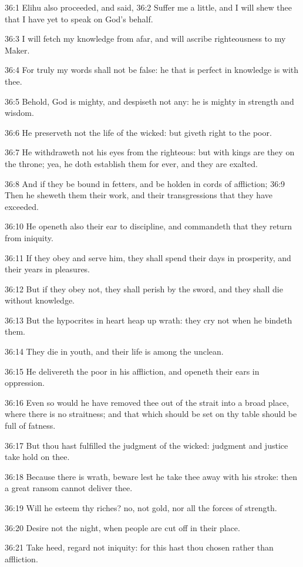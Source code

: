 36:1 Elihu also proceeded, and said, 36:2 Suffer me a little, and I
will shew thee that I have yet to speak on God's behalf.

36:3 I will fetch my knowledge from afar, and will ascribe
righteousness to my Maker.

36:4 For truly my words shall not be false: he that is perfect in
knowledge is with thee.

36:5 Behold, God is mighty, and despiseth not any: he is mighty in
strength and wisdom.

36:6 He preserveth not the life of the wicked: but giveth right to the
poor.

36:7 He withdraweth not his eyes from the righteous: but with kings
are they on the throne; yea, he doth establish them for ever, and they
are exalted.

36:8 And if they be bound in fetters, and be holden in cords of
affliction; 36:9 Then he sheweth them their work, and their
transgressions that they have exceeded.

36:10 He openeth also their ear to discipline, and commandeth that
they return from iniquity.

36:11 If they obey and serve him, they shall spend their days in
prosperity, and their years in pleasures.

36:12 But if they obey not, they shall perish by the sword, and they
shall die without knowledge.

36:13 But the hypocrites in heart heap up wrath: they cry not when he
bindeth them.

36:14 They die in youth, and their life is among the unclean.

36:15 He delivereth the poor in his affliction, and openeth their ears
in oppression.

36:16 Even so would he have removed thee out of the strait into a
broad place, where there is no straitness; and that which should be
set on thy table should be full of fatness.

36:17 But thou hast fulfilled the judgment of the wicked: judgment and
justice take hold on thee.

36:18 Because there is wrath, beware lest he take thee away with his
stroke: then a great ransom cannot deliver thee.

36:19 Will he esteem thy riches? no, not gold, nor all the forces of
strength.

36:20 Desire not the night, when people are cut off in their place.

36:21 Take heed, regard not iniquity: for this hast thou chosen rather
than affliction.

